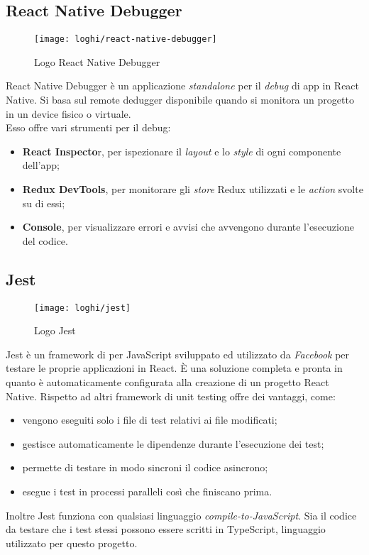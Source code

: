 \subsection{React Native Debugger}
\begin{figure}[H] 
	\centering
	\texttt{[image: loghi/react-native-debugger]}
	\caption{Logo React Native Debugger}
\end{figure}
React Native Debugger è un applicazione \emph{standalone} per il \emph{debug} di app in React 
Native. Si basa sul remote dedugger disponibile quando si monitora un progetto 
in un device fisico o virtuale.\\ Esso offre vari strumenti per il debug:
\begin{itemize}
	\item \textbf{React Inspecto}r, per ispezionare il \emph{layout} e lo \emph{style} di ogni componente dell'app;
	\item \textbf{Redux DevTools}, per monitorare gli \emph{store} Redux utilizzati e le \emph{action} svolte su di essi;
	\item \textbf{Console}, per visualizzare errori e avvisi che avvengono durante l'esecuzione del codice.
\end{itemize}

\subsection{Jest} \label{subsez:jest}
\begin{figure}[H] 
	\centering
	\texttt{[image: loghi/jest]}
	\caption{Logo Jest}
\end{figure}
Jest è un framework di  per JavaScript sviluppato ed utilizzato da 
\emph{Facebook} per testare le proprie applicazioni in React. È una soluzione completa 
e pronta in quanto è automaticamente configurata alla creazione di un progetto 
React Native.
Rispetto ad altri framework di unit testing offre dei vantaggi, come: 
\begin{itemize}
	\item vengono eseguiti solo i file di test relativi ai file modificati;
	\item gestisce automaticamente le dipendenze durante l'esecuzione dei test;
	\item permette di testare in modo sincroni il codice asincrono;
	\item esegue i test in processi paralleli così che finiscano prima.
\end{itemize}
Inoltre Jest funziona con qualsiasi linguaggio \emph{compile-to-JavaScript}. 
Sia il codice da testare che i test stessi possono essere scritti in TypeScript, 
linguaggio utilizzato per questo progetto. 
